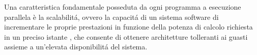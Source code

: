 Una caratteristica fondamentale posseduta da ogni programma a esecuzione parallela
è la scalabilit\'a, ovvero la capacit\'a di un sistema software di incrementare le proprie prestazioni in funzione della potenza di calcolo richiesta in un preciso istante \cite{Michael2007},
che consente di ottenere architetture tolleranti ai guasti assieme a un'elevata disponibilit\'a del sistema.
